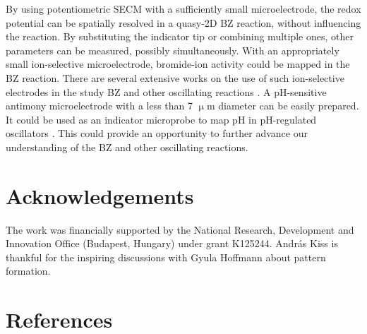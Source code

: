 \documentclass[3p, twocolumn]{elsarticle}
\begin{document}
By using potentiometric SECM with a sufficiently small microelectrode, the redox potential can be spatially resolved in a quasy-2D BZ reaction, without influencing the reaction.
By substituting the indicator tip or combining multiple ones, other parameters can be measured, possibly simultaneously.
With an appropriately small ion-selective microelectrode, bromide-ion activity could be mapped in the BZ reaction.
There are several extensive works on the use of such ion-selective electrodes in the study BZ and other oscillating reactions \cite{noszticzius1, noszticzius2}.
A pH-sensitive antimony microelectrode with a less than 7 $\upmu$m diameter can be easily prepared.
It could be used as an indicator microprobe to map pH in pH-regulated oscillators \cite{orban}.
This could provide an opportunity to further advance our understanding of the BZ and other oscillating reactions.

\section*{Acknowledgements}
The work was financially supported by the National Research, Development and Innovation Office (Budapest, Hungary) under grant K125244.
András Kiss is thankful for the inspiring discussions with Gyula Hoffmann about pattern formation.
\section*{References}
\end{document}
